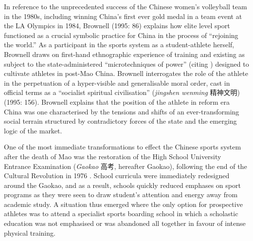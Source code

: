 {In reference to the unprecedented success of the Chinese women’s volleyball team in the 1980s, including winning China's first ever gold medal in a team event at the LA Olympics in 1984, Brownell (1995: 86) explains how elite level sport functioned as a crucial symbolic practice for China in the process of ``rejoining the world.''  As a participant in the sports system as a student-athlete herself, Brownell draws on first-hand ethnographic experience of training and existing as subject to the state-administered ``microtechniques of power'' (citing \cite{Foucault1977}) designed to cultivate athletes in post-Mao China.  Brownell interrogates the role of the athlete in the perpetuation of a hyper-visible and generalisable moral order, cast in official terms as a ``socialist spiritual civilisation'' (\textit{jingshen wenming} 精神文明) (1995: 156).  Brownell explains that the position of the athlete in reform era China was one characterised by the tensions and shifts of an ever-transforming social terrain structured by contradictory forces of the state and the emerging logic of the market.

One of the most immediate transformations to effect the Chinese sports system after the death of Mao was the restoration of the High School University Entrance Examination (\textit{Gaokao} 高考, hereafter Gaokao), following the end of the Cultural Revolution in 1976 \citep[198]{Brownell1995}.  School curricula were immediately redesigned around the Gaokao, and as a result, schools quickly reduced emphases on sport programs as they were seen to draw student’s attention and energy away from academic study.  A situation thus emerged where the only option for prospective athletes was to attend a specialist sports boarding school in which a scholastic education was not emphasised or was abandoned all together in favour of intense physical training.

}
